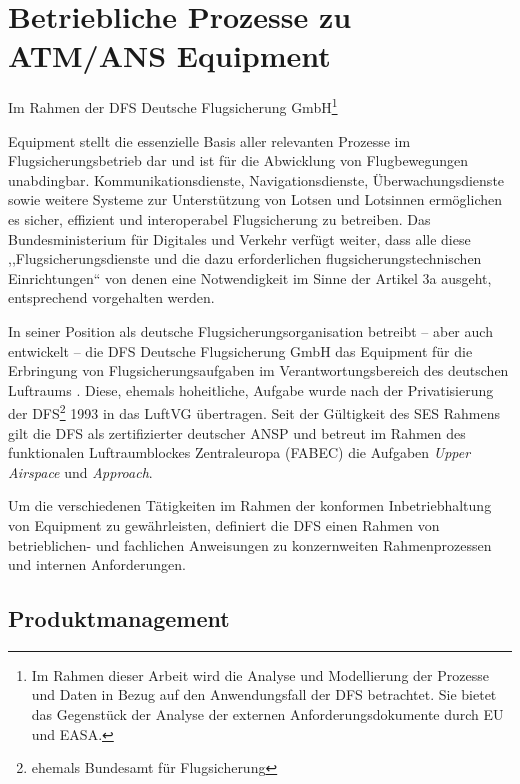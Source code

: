 \chapter{Betriebliche Prozesse zu ATM/ANS Equipment}

\begin{center}
    \footnotesize
    Im Rahmen der DFS Deutsche Flugsicherung GmbH\footnote{Im Rahmen dieser Arbeit wird die Analyse und Modellierung der Prozesse und Daten in Bezug auf den Anwendungsfall der DFS betrachtet. Sie bietet das Gegenstück der Analyse der externen Anforderungsdokumente durch EU und EASA.}
\end{center}

\noindent
\atmans Equipment stellt die essenzielle Basis aller relevanten Prozesse im Flugsicherungsbetrieb dar und ist für die Abwicklung von Flugbewegungen unabdingbar. 
Kommunikationsdienste, Navigationsdienste, Überwachungsdienste sowie weitere Systeme zur Unterstützung von Lotsen und Lotsinnen ermöglichen es sicher, effizient und interoperabel Flugsicherung zu betreiben.
Das Bundesministerium für Digitales und Verkehr verfügt weiter, dass alle diese ,,Flugsicherungsdienste und die dazu erforderlichen flugsicherungstechnischen Einrichtungen`` von denen eine Notwendigkeit im Sinne der  Artikel 3a ausgeht, entsprechend vorgehalten werden.
\cite[§27 d]{luftvg}

\medskip
In seiner Position als deutsche Flugsicherungsorganisation betreibt -- aber auch entwickelt -- die DFS Deutsche Flugsicherung GmbH das \atmans Equipment für die Erbringung von Flugsicherungsaufgaben im Verantwortungsbereich des deutschen Luftraums 
\cite[§27 c]{luftvg}.
Diese, ehemals hoheitliche, Aufgabe wurde nach der Privatisierung der \ac{DFS}\footnote{ehemals Bundesamt für Flugsicherung} 1993 in das \ac{LuftVG} übertragen.
Seit der Gültigkeit des \ac{SES} Rahmens gilt die \ac{DFS} als zertifizierter deutscher \acf{ANSP} und betreut im Rahmen des funktionalen Luftraumblockes Zentraleuropa (\acs{FABEC}) die Aufgaben \textit{Upper Airspace} und \textit{Approach}. 

\medskip
Um die verschiedenen Tätigkeiten im Rahmen der konformen Inbetriebhaltung von \atmans Equipment zu gewährleisten, definiert die \ac{DFS} einen Rahmen von betrieblichen- und fachlichen Anweisungen zu konzernweiten Rahmenprozessen und internen Anforderungen. \cite[vgl.][]{fa_freigaben,ba_technik}   

    \section{Produktmanagement}

